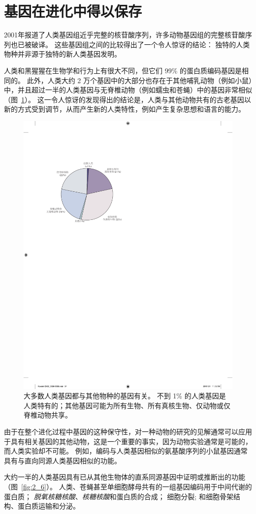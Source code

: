 \section{基因在进化中得以保存}

2001年报道了人类基因组近乎完整的核苷酸序列，许多动物基因组的完整核苷酸序列也已被破译。
这些基因组之间的比较得出了一个令人惊讶的结论：
独特的人类物种并非源于独特的新人类基因发明。


人类和黑猩猩在生物学和行为上有很大不同，但它们 99\% 的蛋白质编码基因是相同的。
此外，人类大约 2 万个基因中的大部分也存在于其他哺乳动物（例如小鼠）中，并且超过一半的人类基因与无脊椎动物（例如蠕虫和苍蝇）中的基因非常相似（图~\ref{fig:2_5}）。
这一令人惊讶的发现得出的结论是，人类与其他动物共有的古老基因以新的方式受到调节，从而产生新的人类特性，例如产生复杂思想和语言的能力。


\begin{figure}[htbp]
	\centering
	\includegraphics[width=0.55\linewidth]{chap02/fig_2_5}
	\caption{大多数人类基因都与其他物种的基因有关。
		不到 1\% 的人类基因是人类特有的；其他基因可能为所有生物、所有真核生物、仅动物或仅脊椎动物共享\cite{international2001initial}。}
	\label{fig:2_5}
\end{figure}


由于在整个进化过程中基因的这种保守性，对一种动物的研究的见解通常可以应用于具有相关基因的其他动物，这是一个重要的事实，因为动物实验通常是可能的，而人类实验却不可能。
例如，编码与人类基因相似的氨基酸序列的小鼠基因通常具有与直向同源人类基因相似的功能。


大约一半的人类基因具有已从其他生物体的直系同源基因中证明或推断出的功能（图~\ref{fig:2_6}）。
人类、苍蝇甚至单细胞酵母共有的一组基因编码用于中间代谢的蛋白质；
\textit{脱氧核糖核酸}、\textit{核糖核酸}和蛋白质的合成；
细胞分裂; 和细胞骨架结构、蛋白质运输和分泌。


